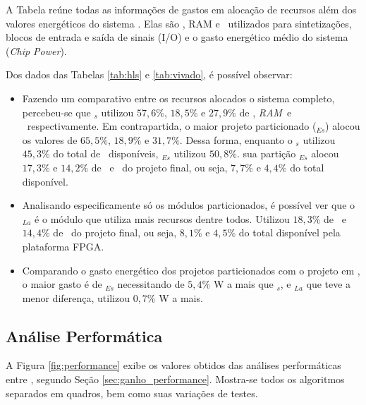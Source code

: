         A Tabela reúne todas as informações de gastos em alocação de recursos além dos valores energéticos do sistema \wearable.
        Elas são \luts, \luts RAM e \ffs\ utilizados para sintetizações, blocos de entrada e saída de sinais (I/O) e o gasto energético médio do sistema (\textit{Chip Power}).
    
        Dos dados das Tabelas \ref{tab:hls} e \ref{tab:vivado}, é possível observar:
        \begin{itemize}
            \item 
            Fazendo um comparativo entre os recursos alocados o sistema completo, percebeu-se que \Ss$_{s}$ utilizou $57,6\%$, $18,5\%$ e $27,9\%$ de \lut, \lut\textit{RAM}\ e \ff\ respectivamente.
            Em contrapartida, o maior projeto particionado (\Ss$_{Es}$) alocou os valores de $65,5\%$, $18,9\%$ e $31,7\%$.
            Dessa forma, enquanto o \Ss$_{s}$ utilizou $45,3\%$ do total de \luts\ disponíveis, \Ss$_{Es}$ utilizou $50,8\%$.
            sua partição \A$_{Es}$ alocou $17,3\%$ e $14,2\%$ de \lut\ e \ff\ do projeto final, ou seja, $7,7\%$ e $4,4\%$ do total disponível.
            
            \item
            Analisando especificamente só os módulos particionados, é possível ver que o \A$_{La}$ é o módulo que utiliza mais recursos dentre todos. 
            Utilizou $18,3\%$ de \lut\ e $14,4\%$ de \ff\ do projeto final, ou seja, $8,1\%$ e $4,5\%$ do total disponível pela plataforma FPGA.
            
            \item
            Comparando o gasto energético dos projetos particionados com o projeto em \software, o maior gasto é de \Ss$_{Es}$ necessitando de $5,4\%$ W a mais que \Ss$_{s}$, e \Ss$_{La}$ que teve a menor diferença, utilizou $0,7\%$ W a mais.
        \end{itemize}
        
    \subsection{Análise Performática}
    
        A Figura \ref{fig:performance} exibe os valores obtidos das análises performáticas entre \hs, segundo Seção \ref{sec:ganho_performance}.
        Mostra-se todos os algoritmos separados em quadros, bem como suas variações de testes.
        
